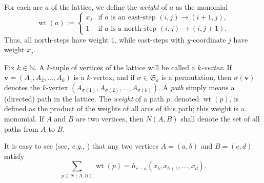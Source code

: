 \documentclass[reqno]{amsart}
\newcommand{\0}{\phantom{c}}
\newcommand{\SymGp}[1]{\mathfrak{S}_{#1}} %
\DeclareMathOperator{\wt}{wt} %
\newcommand{\vv}{\mathbf{v}}
\newcommand{\NN}{\mathbb{N}}
\let\sumnonlimits\sum
\renewcommand{\sum}{\sumnonlimits\limits}
\newenvironment{verlong}{}{}
\newcommand{\set}[1]{\left\{ #1 \right\}}
\newcommand{\tup}[1]{\left( #1 \right)}
\newcommand{\defn}[1]{{\color{darkred}\emph{#1}}} %
\theoremstyle{plain}
\theoremstyle{definition}
\numberwithin{equation}{section}
\begin{document}
For each arc $a$ of the lattice, we define the \defn{weight} of $a$ as the monomial
\[
\wt(a) :=
\begin{cases}
x_j & \text{if $a$ is an east-step } (i,j) \to (i+1,j), \\
1 & \text{if $a$ is a north-step } (i,j) \to (i,j+1).
\end{cases}
\]
Thus, all north-steps have weight $1$, while east-steps with $y$-coordinate $j$ have weight $x_j$.

Fix $k \in \NN$.
A $k$-tuple of vertices of the lattice will be called a \defn{$k$-vertex}.
\begin{verlong}
If $\vv = \tup{A_1, A_2, \dotsc, A_k}$ is a $k$-vertex, and if $\sigma \in \SymGp{k}$ is a permutation, then $\sigma(\vv)$ denotes the $k$-vertex $\tup{A_{\sigma(1)}, A_{\sigma(2)}, \dotsc, A_{\sigma(k)}}$.
\end{verlong}
A \defn{path} simply means a (directed) path in the lattice.
The \defn{weight} of a path $p$, denoted $\wt(p)$, is defined as the product of the weights of all arcs of this path; this weight is a monomial.
If $A$ and $B$ are two vertices, then \defn{$N(A,B)$} shall denote the set of all paths from $A$ to $B$.

It is easy to see (see, \textit{e.g.}, \cite[(2.36)]{Stanley-EC1}) that any two vertices $A = (a,b)$ and $B = (c,d)$ satisfy
\begin{equation}
\label{eq.LGV.single-paths}
\sum_{p \in N(A,B)} \wt(p) = h_{c-a}(x_{b}, x_{b+1}, \dotsc, x_{d}).
\end{equation}
\end{document}

